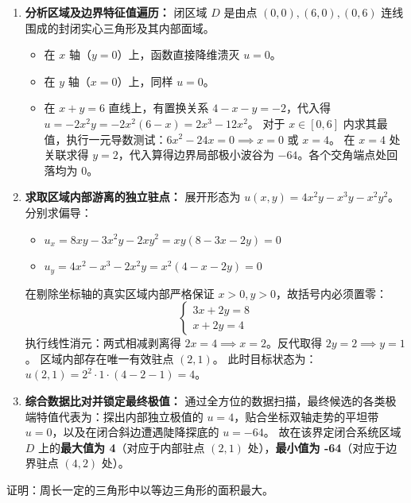\documentclass[lang=cn,11pt]{elegantbook}
\begin{document}
\begin{solution}
\begin{enumerate}
    \item \textbf{分析区域及边界特征值遍历：}
    闭区域 $D$ 是由点 $(0,0), (6,0), (0,6)$ 连线围成的封闭实心三角形及其内部面域。
    \begin{itemize}
        \item 在 $x$ 轴（$y=0$）上，函数直接降维溃灭 $u = 0$。
        \item 在 $y$ 轴（$x=0$）上，同样 $u = 0$。
        \item 在 $x+y=6$ 直线上，有置换关系 $4-x-y = -2$，代入得 $u = -2x^2y = -2x^2(6-x) = 2x^3 - 12x^2$。
              对于 $x \in [0,6]$ 内求其最值，执行一元导数测试：$6x^2-24x = 0 \implies x=0$ 或 $x=4$。
              在 $x=4$ 处关联求得 $y=2$，代入算得边界局部极小波谷为 $-64$。各个交角端点处回落均为 0。
    \end{itemize}

    \item \textbf{求取区域内部游离的独立驻点：}
    展开形态为 $u(x,y) = 4x^2y - x^3y - x^2y^2$。
    分别求偏导：
    \begin{itemize}
        \item $u_x = 8xy - 3x^2y - 2xy^2 = xy(8 - 3x - 2y) = 0$
        \item $u_y = 4x^2 - x^3 - 2x^2y = x^2(4 - x - 2y) = 0$
    \end{itemize}
    在剔除坐标轴的真实区域内部严格保证 $x>0, y>0$，故括号内必须置零：
    \[
    \begin{cases}
    3x+2y = 8 \\
    x+2y = 4
    \end{cases}
    \]
    执行线性消元：两式相减剥离得 $2x=4 \implies x=2$。反代取得 $2y=2 \implies y=1$。
    区域内部存在唯一有效驻点 $(2,1)$。
    此时目标状态为：$u(2,1) = 2^2 \cdot 1 \cdot (4-2-1) = 4$。

    \item \textbf{综合数据比对并锁定最终极值：}
    通过全方位的数据扫描，最终候选的各类极端特值代表为：探出内部独立极值的 $u=4$，贴合坐标双轴走势的平坦带 $u=0$，以及在闭合斜边遭遇陡降探底的 $u=-64$。
    故在该界定闭合系统区域 $D$ 上的\textbf{最大值为 4}（对应于内部驻点 $(2,1)$ 处），\textbf{最小值为 -64}（对应于边界驻点 $(4,2)$ 处）。
\end{enumerate}
\end{solution}

\begin{exercise}[几何极值应用]
证明：周长一定的三角形中以等边三角形的面积最大。
\end{exercise}
\end{document}
